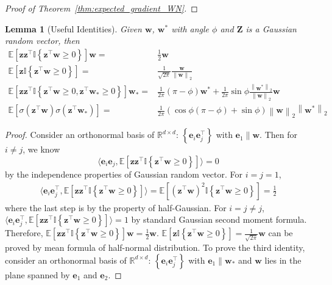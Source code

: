 \documentclass{article}
\newcommand{\vect}[1]{\mathbf{#1}}
\newcommand{\norm}[1]{\left\|#1\right\|}
\newcommand{\expect}{\mathbb{E}}
\newcommand{\indict}{\mathbb{I}}
\newcommand{\relu}[1]{\sigma\left(#1\right)}
\newtheorem{lem}{Lemma}[section]
\begin{document}
\begin{proof}[Proof of Theorem~\ref{thm:expected_gradient_WN}]
\end{proof}\begin{lem}[Useful Identities]\label{lem:gaussian_basic_facts}
Given $\vect{w}$, $\vect{w}^*$ with angle $\phi$ and $\vect{Z}$ is a Gaussian random vector, then
\begin{align*}
\expect\left[\vect{z}\vect{z}^\top\indict\left\{\vect{z}^\top\vect{w}\ge 0\right\}\right]\vect{w} =& \frac{1}{2}\vect{w}\\
\expect\left[\vect{z}\indict\left\{\vect{z}^\top\vect{w}\ge 0\right\}\right] = & \frac{1}{\sqrt{2\pi}}\frac{\vect{w}}{\norm{\vect{w}}_2} \\
\expect\left[\vect{z}\vect{z}^\top\indict\left\{\vect{z}^\top\vect{w}\ge 0,\vect{z}^\top \vect{w}_*\ge 0\right\}\right]\vect{w}_* = &\frac{1}{2\pi}\left(\pi-\phi\right)\vect{w}^* + \frac{1}{2\pi}\sin\phi\frac{\norm{\vect{w}^*}_2}{\norm{\vect{w}}_2}\vect{w} \\
\expect\left[\relu{\vect{z}^\top\vect{w}}\relu{\vect{z}^\top\vect{w}_*}\right] = & \frac{1}{2\pi}\left(\cos\phi\left(\pi-\phi\right)+\sin\phi\right)\norm{\vect{w}}_2\norm{\vect{w}^*}_2
\end{align*}
\end{lem}\begin{proof}
Consider an orthonormal basis of $\mathbb{R}^{d \times d}$: $\left\{\vect{e}_i\vect{e}_j^\top\right\}$ with $\vect{e}_1 \parallel \vect{w}$.
Then for $i \neq j$, we know \[\langle \vect{e}_i\vect{e}_j, \expect\left[\vect{z}\vect{z}^\top\indict\left\{\vect{z}^\top\vect{w}\ge 0\right\}\right] \rangle= 0\] by the independence properties of Gaussian random vector.
For $i=j=1$, \begin{align*}\langle \vect{e}_i\vect{e}_j^\top, \expect\left[\vect{z}\vect{z}^\top\indict\left\{\vect{z}^\top\vect{w}\ge 0\right\}\right]\rangle
=    \expect\left[\left(\vect{z}^\top\vect{w}\right)^2\indict\left\{\vect{z}^\top\vect{w}\ge 0 \right\}\right] =  \frac{1}{2}
\end{align*}
where the last step is by the property of half-Gaussian.
For $i=j\neq j$, $\langle \vect{e}_i\vect{e}_j^\top, \expect\left[\vect{z}\vect{z}^\top\indict\left\{\vect{z}^\top\vect{w}\ge 0\right\}\right]\rangle
=1$ by standard Gaussian second moment formula.
Therefore, $ \expect\left[\vect{z}\vect{z}^\top\indict\left\{\vect{z}^\top\vect{w}\ge 0\right\}\right]\vect{w} = \frac{1}{2}\vect{w}$.
$\expect\left[\vect{z}\indict\left\{\vect{z}^\top\vect{w}\ge 0\right\}\right] =  \frac{1}{\sqrt{2\pi}}\vect{w}$ can be proved by mean formula of half-normal distribution.
To prove the third identity, consider an orthonormal basis of $\mathbb{R}^{d \times d}$: $\left\{\vect{e}_i\vect{e}_j^\top \right\}$ with $\vect{e}_1 \parallel \vect{w}_*$ and $\vect{w}$ lies in the plane spanned by $\vect{e}_1$ and $\vect{e}_2$.

\end{proof}
\end{document}

